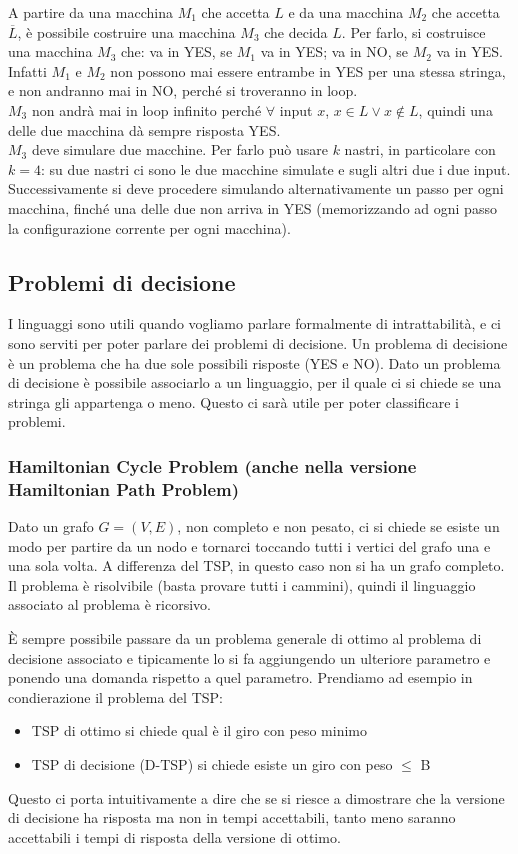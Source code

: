{ \medskip}
A partire da una macchina $M_1$ che accetta $L$ e da una macchina $M_2$ che accetta $\overline{L}$, è possibile costruire una macchina $M_3$ che decida $L$.
Per farlo, si costruisce una macchina $M_3$ che: va in YES, se $M_1$ va in YES; va in NO, se $M_2$ va in YES. \\
Infatti $M_1$ e $M_2$ non possono mai essere entrambe in YES per una stessa stringa, e non andranno mai in NO, perché si troveranno in loop. \\
$M_3$ non andrà mai in loop infinito perché $\forall$ input $x$, $x \in L \lor x \notin L$, quindi una delle due macchina dà sempre risposta YES. \\
$M_3$ deve simulare due macchine. Per farlo può usare $k$ nastri, in particolare con $k=4$: su due nastri ci sono le due macchine simulate e sugli altri due i due input. Successivamente si deve procedere simulando alternativamente un passo per ogni macchina, finché una delle due non arriva in YES (memorizzando ad ogni passo la configurazione corrente per ogni macchina).\\

\subsection{Problemi di decisione}
I linguaggi sono utili quando vogliamo parlare formalmente di intrattabilità, e ci sono serviti per poter parlare dei problemi di decisione. Un problema di decisione è un problema che ha due sole possibili risposte (YES e NO). Dato un problema di decisione è possibile associarlo a un linguaggio, per il quale ci si chiede se una stringa gli appartenga o meno. Questo ci sarà utile per poter classificare i problemi.
\subsubsection{Hamiltonian Cycle Problem (anche nella versione Hamiltonian Path Problem)}
Dato un grafo $G=(V,E)$, non completo e non pesato, ci si chiede se esiste un modo per partire da un nodo e tornarci toccando tutti i vertici del grafo una e una sola volta. A differenza del TSP, in questo caso non si ha un grafo completo.  
Il problema è risolvibile (basta provare tutti i cammini), quindi il linguaggio associato al problema è ricorsivo. 

{\medskip}

È sempre possibile passare da un problema generale di ottimo al problema di decisione associato e tipicamente lo si fa aggiungendo un ulteriore parametro e ponendo una domanda rispetto a quel parametro. Prendiamo ad esempio in condierazione il problema del TSP:
\begin{itemize}
    \item TSP di ottimo si chiede qual è il giro con peso minimo
    \item TSP di decisione (D-TSP) si chiede esiste un giro con peso $\leq$ B
\end{itemize}
Questo ci porta intuitivamente a dire che se si riesce a dimostrare che la versione di decisione ha risposta ma non in tempi accettabili, tanto meno saranno accettabili i tempi di risposta della versione di ottimo. 

